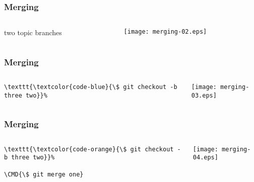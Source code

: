 \documentclass[english]{beamer}
\newcommand{\CMD}[1]{%
\texttt{\textcolor{code-blue}{#1}}%
}
\newcommand{\cmd}[1]{%
\texttt{\textcolor{code-orange}{#1}}%
}
\begin{document}
\begin{frame}
\frametitle{Merging}

\begin{columns}[t]
        \begin{column}[T]{.5\textwidth}
                two topic branches
        \end{column}
        \begin{column}[T]{.5\textwidth}
                \texttt{[image: merging-02.eps]}
        \end{column}
\end{columns}
\end{frame}

\begin{frame}[fragile]
\frametitle{Merging}

\begin{columns}[t]
        \begin{column}[T]{.5\textwidth}
                {\small
                \begin{Verbatim}[commandchars=\\\{\}]
\CMD{\$ git checkout -b three two}
                \end{Verbatim}
                }
        \end{column}
        \begin{column}[T]{.5\textwidth}
                \texttt{[image: merging-03.eps]}
        \end{column}
\end{columns}
\end{frame}

\begin{frame}[fragile]
\frametitle{Merging}

\begin{columns}[t]
        \begin{column}[T]{.5\textwidth}
                {\small
                \begin{Verbatim}[commandchars=\\\{\}]
\cmd{\$ git checkout -b three two}
\CMD{\$ git merge one}
                \end{Verbatim}
                }
        \end{column}
        \begin{column}[T]{.5\textwidth}
                \texttt{[image: merging-04.eps]}
        \end{column}
\end{columns}
\end{frame}
\end{document}
